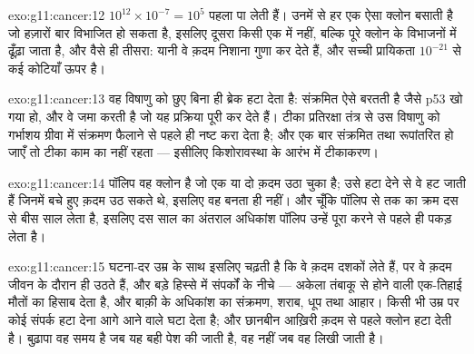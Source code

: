 \begin{solution}{exo:g11:cancer:12}
$10^{12} \times 10^{-7} = 10^5$  पहला  पा लेती हैं।
उनमें से हर एक ऐसा क्लोन बसाती है जो हज़ारों बार विभाजित हो सकता है, इसलिए
दूसरा  किसी एक  में नहीं, बल्कि पूरे क्लोन के विभाजनों में
ढूँढ़ा जाता है, और वैसे ही तीसरा: यानी वे क़दम निशाना गुणा कर देते हैं, और
सच्ची प्रायिकता $10^{-21}$ से कई कोटियाँ ऊपर है।
\end{solution}

\begin{solution}{exo:g11:cancer:13}
वह विषाणु   को छुए बिना ही ब्रेक हटा देता है: संक्रमित 
ऐसे बरतती है जैसे p53 खो गया हो, और वे  जमा करती है जो यह
प्रक्रिया पूरी कर देते हैं। टीका प्रतिरक्षा तंत्र से उस विषाणु को गर्भाशय
ग्रीवा में संक्रमण फैलाने से पहले ही नष्ट करा देता है; और एक बार 
संक्रमित तथा रूपांतरित हो जाएँ तो टीका काम का नहीं रहता --- इसीलिए
किशोरावस्था के आरंभ में टीकाकरण।
\end{solution}

\begin{solution}{exo:g11:cancer:14}
पॉलिप वह क्लोन है जो एक या दो क़दम उठा चुका है; उसे हटा देने से वे
 हट जाती हैं जिनमें बचे हुए क़दम उठ सकते थे, इसलिए वह  बनता
ही नहीं। और चूँकि पॉलिप से  तक का क्रम दस से बीस साल लेता है, इसलिए
दस साल का अंतराल अधिकांश पॉलिप उन्हें पूरा करने से पहले ही पकड़ लेता है।
\end{solution}

\begin{solution}{exo:g11:cancer:15}
घटना-दर उम्र के साथ इसलिए चढ़ती है कि वे क़दम दशकों लेते हैं, पर वे क़दम
जीवन के दौरान ही उठते हैं, और बड़े हिस्से में संपर्कों के नीचे ---
अकेला तंबाकू  से होने वाली एक-तिहाई मौतों का हिसाब देता है, और बाक़ी
के अधिकांश का संक्रमण, शराब, धूप तथा आहार। किसी भी उम्र पर कोई संपर्क हटा
देना आगे आने वाले  घटा देता है; और छानबीन आख़िरी क़दम से पहले
क्लोन हटा देती है। बुढ़ापा वह समय है जब यह बही पेश की जाती है, वह नहीं जब
वह लिखी जाती है।
\end{solution}

